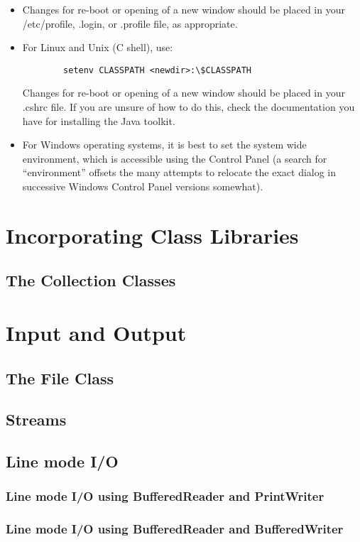 {\begin{itemize}
\item Changes for re-boot or opening of a new window should be placed in your /etc/profile, .login, or .profile file, as appropriate. 
\item For Linux and Unix (C shell), use:
\begin{verbatim}
        setenv CLASSPATH <newdir>:\$CLASSPATH 
\end{verbatim}
Changes for re-boot or opening of a new window should be placed in
your .cshrc file. If you are unsure of how to do this, check the
documentation you have for installing the Java toolkit.
\item For Windows operating systems, it is best to set the system wide
  environment, which is accessible using the Control Panel (a search
  for ``environment'' offsets the many attempts to relocate the exact
  dialog in successive Windows Control Panel versions somewhat).
\end{itemize}

\chapter{Incorporating Class Libraries}
\section{The Collection Classes}

\chapter{Input and Output}
\section{The File Class}
\section{Streams}
\section{Line mode I/O}
\subsection{Line mode I/O using BufferedReader and PrintWriter}
\subsection{Line mode I/O using BufferedReader and BufferedWriter}
}
